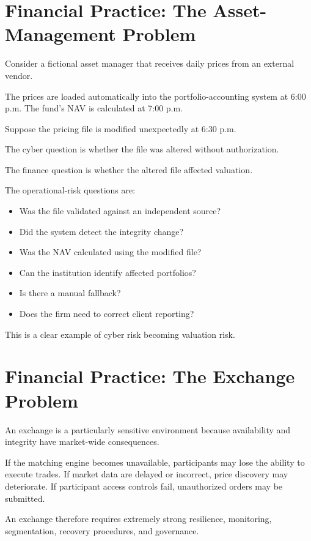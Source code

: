 \section{Financial Practice: The Asset-Management Problem}

Consider a fictional asset manager that receives daily prices from an external vendor.

The prices are loaded automatically into the portfolio-accounting system at 6:00 p.m. The fund's NAV is calculated at 7:00 p.m.

Suppose the pricing file is modified unexpectedly at 6:30 p.m.

The cyber question is whether the file was altered without authorization.

The finance question is whether the altered file affected valuation.

The operational-risk questions are:

\begin{itemize}
    \item Was the file validated against an independent source?
    \item Did the system detect the integrity change?
    \item Was the NAV calculated using the modified file?
    \item Can the institution identify affected portfolios?
    \item Is there a manual fallback?
    \item Does the firm need to correct client reporting?
\end{itemize}

This is a clear example of cyber risk becoming valuation risk.

\section{Financial Practice: The Exchange Problem}

An exchange is a particularly sensitive environment because availability and integrity have market-wide consequences.

If the matching engine becomes unavailable, participants may lose the ability to execute trades. If market data are delayed or incorrect, price discovery may deteriorate. If participant access controls fail, unauthorized orders may be submitted.

An exchange therefore requires extremely strong resilience, monitoring, segmentation, recovery procedures, and governance.

